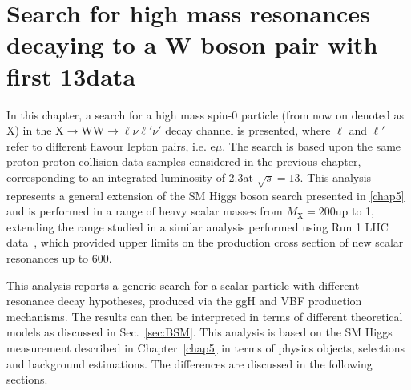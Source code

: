 \chapter[Search for high mass resonances decaying to a W boson pair with first \boldmath$13\TeV$ data]{Search for high mass resonances decaying to a W boson pair with first 13\TeV data}\label{chap6}
\thispagestyle{empty}

In this chapter, a search for a high mass spin-0 particle (from now on denoted as X) in the X$\rightarrow$WW$\rightarrow \ell\nu\ell'\nu'$ decay channel is presented, where $\ell$ and $\ell'$ refer to different flavour lepton pairs, i.e. e$\mu$. 
The search is based upon the same proton-proton collision data samples considered in the previous chapter, corresponding to an integrated luminosity of 2.3\ifb  at $\sqrt{s} = 13$\TeV. This analysis represents a general extension of the SM Higgs boson search presented in \ref{chap5} and is performed in a range of heavy scalar masses from $M_\mathrm{X} = 200$\GeV up to 1\TeV, extending the range studied in a similar analysis performed using Run 1 LHC data~\cite{Khachatryan:2015cwa}, which provided upper limits on the production cross section of new scalar resonances up to 600\GeV.


This analysis reports a generic search for a scalar particle with different resonance decay hypotheses, produced via the ggH and VBF production mechanisms. The results can then be interpreted in terms of different theoretical models as discussed in Sec.~\ref{sec:BSM}. This analysis is based on the SM Higgs measurement described in Chapter~\ref{chap5} in terms of physics objects, selections and background estimations. The differences are discussed in the following sections.

%






